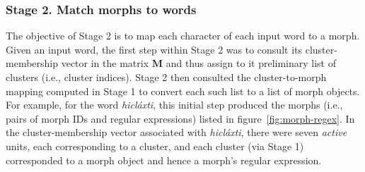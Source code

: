 
\subsubsection{Stage 2. Match morphs to words}
 
The objective of Stage 2 is to map each character of each input word to a morph. %
Given an input word, the first step within Stage 2 was to consult its cluster-membership vector in the matrix $\mathbf{M}$ 
and thus assign to it preliminary list 
of clusters (i.e., cluster indices).  
Stage 2 then consulted the cluster-to-morph mapping computed in Stage 1 to convert each such list to a list of morph objects. %
For example, for the word \textit{hicl\'{a}xti},
this initial step produced the morphs (i.e., pairs of morph IDs and regular expressions)  listed in 
figure~\ref{fig:morph-regex}. In the cluster-membership vector associated with 
\textit{hicl\'{a}xti}, there were seven \emph{active} units, each corresponding to a cluster, and each cluster (via Stage 1) corresponded to a morph object and hence
a morph's regular expression. 


